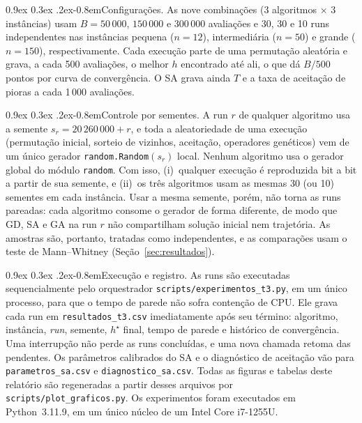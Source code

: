\documentclass[10pt,a4paper,twocolumn]{article}
\makeatletter
\renewcommand\paragraph{\@startsection{paragraph}{4}{\z@}%
  {0.9ex \@plus 0.3ex \@minus .2ex}{-0.8em}{\normalfont\normalsize\bfseries}}
\makeatother
\begin{document}
\paragraph{Configurações.}
As nove combinações (3 algoritmos $\times$ 3 instâncias) usam
$B=50\,000$, $150\,000$ e $300\,000$ avaliações e 30, 30 e 10 runs
independentes nas instâncias pequena ($n=12$), intermediária ($n=50$) e grande
($n=150$), respectivamente. Cada execução parte de uma permutação aleatória e grava, a cada
500 avaliações, o melhor $h$ encontrado até ali, o que dá $B/500$ pontos por curva de
convergência. O SA grava ainda $T$ e a taxa de aceitação de pioras a cada 1\,000
avaliações.

\paragraph{Controle por sementes.}
A run $r$ de qualquer algoritmo usa a semente $s_r = 20\,260\,000 + r$, e toda a
aleatoriedade de uma execução (permutação inicial, sorteio de vizinhos, aceitação,
operadores genéticos) vem de um único gerador \texttt{random.Random}$(s_r)$ local.
Nenhum algoritmo usa o gerador global do módulo \texttt{random}. Com isso,
(i)~qualquer execução é reproduzida bit a bit a partir de sua semente, e
(ii)~os três algoritmos usam as mesmas 30 (ou 10) sementes em cada instância.
Usar a mesma semente, porém, não torna as runs pareadas: cada algoritmo consome
o gerador de forma diferente, de modo que GD, SA e GA na run $r$ não compartilham
solução inicial nem trajetória. As amostras são, portanto, tratadas como
independentes, e as comparações usam o teste de Mann--Whitney
(Seção~\ref{sec:resultados}).

\paragraph{Execução e registro.}
As runs são executadas sequencialmente pelo orquestrador
\texttt{scripts/experimentos\_t3.py}, em um único processo, para que o tempo de
parede não sofra contenção de CPU. Ele grava cada
run em \texttt{resultados\_t3.csv} imediatamente após seu término: algoritmo,
instância, \textit{run}, semente, $h^\star$ final, tempo de parede e histórico de
convergência. Uma interrupção não perde as runs concluídas, e uma nova chamada
retoma das pendentes. Os parâmetros calibrados do SA e o diagnóstico de aceitação vão
para \texttt{parametros\_sa.csv} e \texttt{diagnostico\_sa.csv}. Todas as figuras e
tabelas deste relatório são regeneradas a partir desses arquivos por
\texttt{scripts/plot\_graficos.py}. Os experimentos foram executados em Python~3.11.9,
em um único núcleo de um Intel Core i7-1255U.
\end{document}
